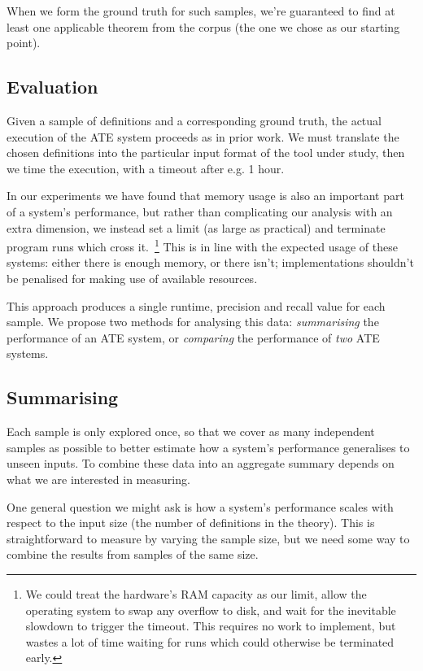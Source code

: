 When we form the ground truth for such samples, we're guaranteed to find at
least one applicable theorem from the corpus (the one we chose as our starting
point).

\subsection{Evaluation}

Given a sample of definitions and a corresponding ground truth, the actual
execution of the ATE system proceeds as in prior work. We must translate the
chosen definitions into the particular input format of the tool under study,
then we time the execution, with a timeout after e.g. 1 hour.

In our experiments we have found that memory usage is also an important part of
a system's performance, but rather than complicating our analysis with an extra
dimension, we instead set a limit (as large as practical) and terminate program
runs which cross it.~\footnote{We could treat the hardware's RAM capacity as our
  limit, allow the operating system to swap any overflow to disk, and wait for
  the inevitable slowdown to trigger the timeout. This requires no work to
  implement, but wastes a lot of time waiting for runs which could otherwise be
  terminated early.} This is in line with the expected usage of these systems:
either there is enough memory, or there isn't; implementations shouldn't be
penalised for making use of available resources.

This approach produces a single runtime, precision and recall value for each
sample. We propose two methods for analysing this data: \emph{summarising}
the performance of an ATE system, or \emph{comparing} the performance of
\emph{two} ATE systems.

\subsection{Summarising}

Each sample is only explored once, so that we cover as many independent samples
as possible to better estimate how a system's performance generalises to unseen
inputs. To combine these data into an aggregate summary depends on what we are
interested in measuring.

One general question we might ask is how a system's performance scales with
respect to the input size (the number of definitions in the theory). This is
straightforward to measure by varying the sample size, but we need some way to
combine the results from samples of the same size.

